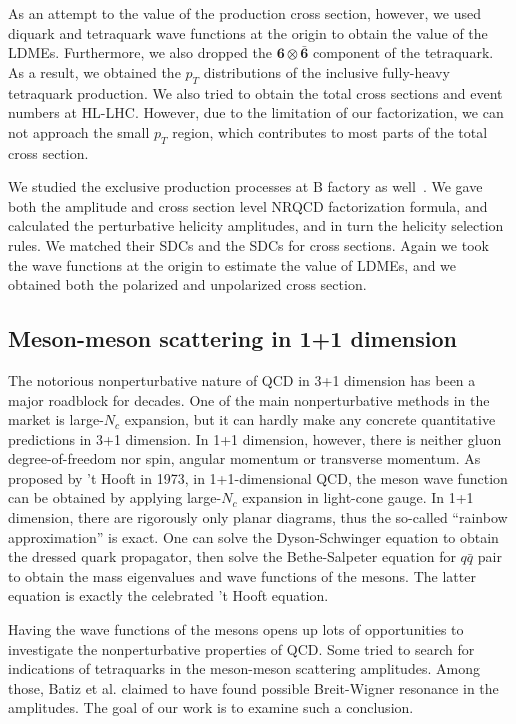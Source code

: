 \documentclass[letterpaper,11pt]{article}
\begin{document}
As an attempt to the value of the production cross section, however, we used diquark and tetraquark wave functions at the origin to obtain the value of the LDMEs. Furthermore, we also dropped the $\mathbf{6}\otimes \mathbf{\bar 6}$ component of the tetraquark. As a result, we obtained the $p_T$ distributions of the inclusive fully-heavy tetraquark production. We also tried to obtain the total cross sections and event numbers at {HL-LHC}. However, due to the limitation of our factorization, we can not approach the small $p_T$ region, which contributes to most parts of the total cross section.

We studied the exclusive production processes at B factory as well~\cite{Feng2020a}. We gave both the amplitude and cross section level NRQCD factorization formula, and calculated the perturbative helicity amplitudes, and in turn the helicity selection rules. We matched their SDCs and the SDCs for cross sections. Again we took the wave functions at the origin to estimate the value of LDMEs, and we obtained both the polarized and unpolarized cross section. 


\subsection*{Meson-meson scattering in 1+1 dimension}
The notorious nonperturbative nature of QCD in 3+1 dimension has been a major roadblock for decades. One of the main nonperturbative methods in the market is large-$N_c$ expansion, but it can hardly make any concrete quantitative predictions in 3+1 dimension. In 1+1 dimension, however, there is neither gluon degree-of-freedom nor spin, angular momentum or transverse momentum. As proposed by 't Hooft in 1973, in 1+1-dimensional QCD, the meson wave function can be obtained by applying large-$N_c$ expansion in light-cone gauge. In 1+1 dimension, there are rigorously only planar diagrams, thus the so-called “rainbow approximation” is exact. One can solve the Dyson-Schwinger equation to obtain the dressed quark propagator, then solve the Bethe-Salpeter equation for $q\bar q$ pair to obtain the mass eigenvalues and wave functions of the mesons. The latter equation is exactly the celebrated 't Hooft equation.

Having the wave functions of the mesons opens up lots of opportunities to investigate the nonperturbative properties of QCD. Some tried to search for indications of tetraquarks in the meson-meson scattering amplitudes. Among those, Batiz et al. claimed to have found possible Breit-Wigner resonance in the amplitudes. The goal of our work is to examine such a conclusion.
\end{document}
